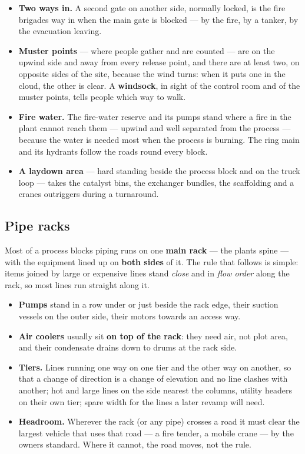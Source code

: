 \documentclass[11pt,a4paper]{article}
\providecommand{\tightlist}{\setlength{\itemsep}{0pt}\setlength{\parskip}{0pt}}
\begin{document}
\begin{itemize}
\item
  \textbf{Two ways in.} A second gate on another side, normally locked,
  is the fire brigade\textquotesingle s way in when the main gate is
  blocked --- by the fire, by a tanker, by the evacuation leaving.
\item
  \textbf{Muster points} --- where people gather and are counted --- are
  on the upwind side and away from every release point, and there are at
  least two, on opposite sides of the site, because the wind turns: when
  it puts one in the cloud, the other is clear. A \textbf{windsock}, in
  sight of the control room and of the muster points, tells people which
  way to walk.
\item
  \textbf{Fire water.} The fire-water reserve and its pumps stand where
  a fire in the plant cannot reach them --- upwind and well separated
  from the process --- because the water is needed most when the process
  is burning. The ring main and its hydrants follow the roads round
  every block.
\item
  \textbf{A laydown area} --- hard standing beside the process block and
  on the truck loop --- takes the catalyst bins, the exchanger bundles,
  the scaffolding and a crane\textquotesingle s outriggers during a
  turnaround.
\end{itemize}

\hypertarget{pipe-racks}{%
\subsection{Pipe racks}\label{pipe-racks}}

Most of a process block\textquotesingle s piping runs on one
\textbf{main rack} --- the plant\textquotesingle s spine --- with the
equipment lined up on \textbf{both sides} of it. The rule that follows is
simple: items joined by large or expensive lines stand \emph{close} and
in \emph{flow order} along the rack, so most lines run straight along it.

\begin{itemize}
\tightlist
\item
  \textbf{Pumps} stand in a row under or just beside the rack edge, their
  suction vessels on the outer side, their motors towards an access way.
\item
  \textbf{Air coolers} usually sit \textbf{on top of the rack}: they need
  air, not plot area, and their condensate drains down to drums at the
  rack side.
\item
  \textbf{Tiers.} Lines running one way on one tier and the other way on
  another, so that a change of direction is a change of elevation and no
  line clashes with another; hot and large lines on the side nearest the
  columns, utility headers on their own tier; spare width for the lines a
  later revamp will need.
\item
  \textbf{Headroom.} Wherever the rack (or any pipe) crosses a road it
  must clear the largest vehicle that uses that road --- a fire tender, a
  mobile crane --- by the owner\textquotesingle s standard. Where it
  cannot, the road moves, not the rule.
\end{itemize}
\end{document}
